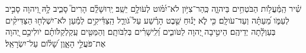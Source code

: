 \documentclass{openreader}
\begin{document}
שִׁ֗יר הַֽמַּ֫עֲלֹ֥ות הַבֹּטְחִ֥ים בַּיהוָ֑ה כְּֽהַר־צִיֹּ֥ון לֹא־יִ֝מֹּ֗וט לְעֹולָ֥ם יֵשֵֽׁב׃ 
יְֽרוּשָׁלִַ֗ם הָרִים֮ סָבִ֪יב לָ֥הּ וַ֭יהוָה סָבִ֣יב לְעַמֹּ֑ו מֵ֝עַתָּ֗ה וְעַד־עֹולָֽם׃ 
כִּ֤י לֹ֪א יָנ֡וּחַ שֵׁ֤בֶט הָרֶ֗שַׁע עַל֮ גֹּורַ֢ל הַֽצַּדִּ֫יקִ֥ים לְמַ֡עַן לֹא־יִשְׁלְח֖וּ הַצַּדִּיקִ֨ים בְּעַוְלָ֬תָה יְדֵיהֶֽם׃ 
הֵיטִ֣יבָה יְ֭הוָה לַטֹּובִ֑ים וְ֝לִֽישָׁרִ֗ים בְּלִבֹּותָֽם׃ 
וְהַמַּטִּ֤ים עַֽקַלְקַלֹּותָ֗ם יֹולִיכֵ֣ם יְ֭הוָה אֶת־פֹּעֲלֵ֣י הָאָ֑וֶן שָׁ֝לֹ֗ום עַל־יִשְׂרָאֵֽל׃ 
\end{document}
